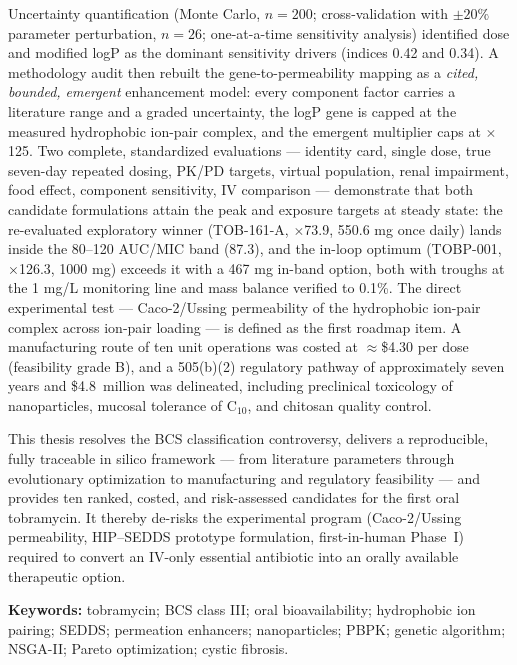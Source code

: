 Uncertainty quantification (Monte Carlo, $n=200$; cross-validation with $\pm20\%$ parameter perturbation, $n=26$; one-at-a-time sensitivity analysis) identified dose and modified logP as the dominant sensitivity drivers (indices 0.42 and 0.34). A methodology audit then rebuilt the gene-to-permeability mapping as a \emph{cited, bounded, emergent} enhancement model: every component factor carries a literature range and a graded uncertainty, the logP gene is capped at the measured hydrophobic ion-pair complex, and the emergent multiplier caps at $\times$125. Two complete, standardized evaluations --- identity card, single dose, true seven-day repeated dosing, PK/PD targets, virtual population, renal impairment, food effect, component sensitivity, IV comparison --- demonstrate that both candidate formulations attain the peak and exposure targets at steady state: the re-evaluated exploratory winner (TOB-161-A, $\times$73.9, 550.6 mg once daily) lands inside the 80--120 AUC/MIC band (87.3), and the in-loop optimum (TOBP-001, $\times$126.3, 1000 mg) exceeds it with a 467 mg in-band option, both with troughs at the 1 mg/L monitoring line and mass balance verified to 0.1\%. The direct experimental test --- Caco-2/Ussing permeability of the hydrophobic ion-pair complex across ion-pair loading --- is defined as the first roadmap item. A manufacturing route of ten unit operations was costed at $\approx$\$4.30 per dose (feasibility grade B), and a 505(b)(2) regulatory pathway of approximately seven years and \$4.8~million was delineated, including preclinical toxicology of nanoparticles, mucosal tolerance of C$_{10}$, and chitosan quality control.

This thesis resolves the BCS classification controversy, delivers a reproducible, fully traceable in silico framework --- from literature parameters through evolutionary optimization to manufacturing and regulatory feasibility --- and provides ten ranked, costed, and risk-assessed candidates for the first oral tobramycin. It thereby de-risks the experimental program (Caco-2/Ussing permeability, HIP--SEDDS prototype formulation, first-in-human Phase~I) required to convert an IV-only essential antibiotic into an orally available therapeutic option.

\bigskip
\noindent\textbf{Keywords:} tobramycin; BCS class III; oral bioavailability; hydrophobic ion pairing; SEDDS; permeation enhancers; nanoparticles; PBPK; genetic algorithm; NSGA-II; Pareto optimization; cystic fibrosis.
